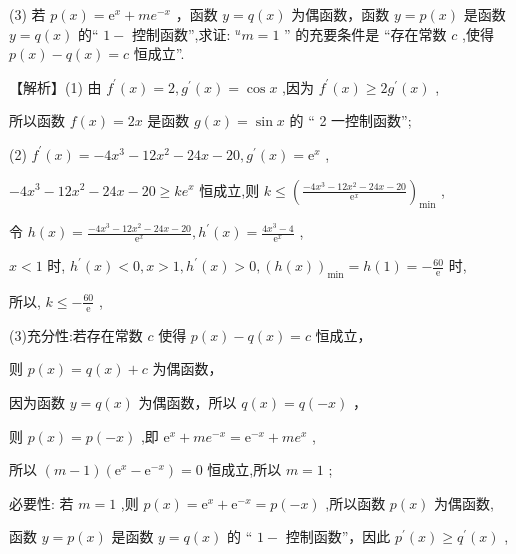 \documentclass[10pt]{article}
\begin{document}
(3) 若 \(p\left( x\right)  = {\mathrm{e}}^{x} + m{e}^{-x}\) ，函数 \(y = q\left( x\right)\) 为偶函数，函数 \(y = p\left( x\right)\) 是函数 \(y = q\left( x\right)\) 的“ \(1 -\) 控制函数”,求证: \({}^{u}m = 1\) ” 的充要条件是 “存在常数 \(c\) ,使得 \(p\left( x\right)  - q\left( x\right)  = c\) 恒成立”.

【解析】(1) 由 \({f}^{\prime }\left( x\right)  = 2,{g}^{\prime }\left( x\right)  = \cos x\) ,因为 \({f}^{\prime }\left( x\right)  \geq  2{g}^{\prime }\left( x\right)\) ,

所以函数 \(f\left( x\right)  = {2x}\) 是函数 \(g\left( x\right)  = \sin x\) 的 “ 2 一控制函数”;

(2) \({f}^{\prime }\left( x\right)  =  - 4{x}^{3} - {12}{x}^{2} - {24x} - {20},{g}^{\prime }\left( x\right)  = {\mathrm{e}}^{x}\) ,

\(- 4{x}^{3} - {12}{x}^{2} - {24x} - {20} \geq  k{e}^{x}\) 恒成立,则 \(k \leq  {\left( \frac{-4{x}^{3} - {12}{x}^{2} - {24x} - {20}}{{\mathrm{e}}^{x}}\right) }_{\min }\) ,

令 \(h\left( x\right)  = \frac{-4{x}^{3} - {12}{x}^{2} - {24x} - {20}}{{\mathrm{e}}^{x}},{h}^{\prime }\left( x\right)  = \frac{4{x}^{3} - 4}{{\mathrm{e}}^{x}}\) ,

\(x < 1\) 时, \({h}^{\prime }\left( x\right)  < 0,x > 1,{h}^{\prime }\left( x\right)  > 0,{\left( h\left( x\right) \right) }_{\min } = h\left( 1\right)  =  - \frac{60}{\mathrm{e}}\) 时,

所以, \(k \leq   - \frac{60}{\mathrm{e}}\) ,

(3)充分性:若存在常数 \(c\) 使得 \(p\left( x\right)  - q\left( x\right)  = c\) 恒成立，

则 \(p\left( x\right)  = q\left( x\right)  + c\) 为偶函数，

因为函数 \(y = q\left( x\right)\) 为偶函数，所以 \(q\left( x\right)  = q\left( {-x}\right)\) ，

则 \(p\left( x\right)  = p\left( {-x}\right)\) ,即 \({\mathrm{e}}^{x} + m{e}^{-x} = {\mathrm{e}}^{-x} + m{e}^{x}\) ,

所以 \(\left( {m - 1}\right) \left( {{\mathrm{e}}^{x} - {\mathrm{e}}^{-x}}\right)  = 0\) 恒成立,所以 \(m = 1\) ;

必要性: 若 \(m = 1\) ,则 \(p\left( x\right)  = {\mathrm{e}}^{x} + {\mathrm{e}}^{-x} = p\left( {-x}\right)\) ,所以函数 \(p\left( x\right)\) 为偶函数,

函数 \(y = p\left( x\right)\) 是函数 \(y = q\left( x\right)\) 的 “ \(1 -\) 控制函数”，因此 \({p}^{\prime }\left( x\right)  \geq  {q}^{\prime }\left( x\right)\) ,
\end{document}
